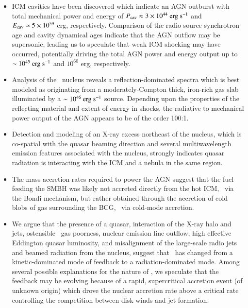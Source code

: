 \documentclass[referee,traditabstract]{aa}
\begin{document}
\begin{itemize}
\item ICM cavities have been discovered which indicate an AGN outburst
  with total mechanical power and energy of $P_{\rm{cav}} \approx 3 \times
  10^{44} ~\rm{\mbox{\ensuremath{\rm{erg}}}~\ensuremath{\rm{\mbox{\ensuremath{\rm{s}}}^{-1}}}}$ and $E_{\rm{cav}} \approx 5 \times 10^{59}$ erg,
  respectively. Comparison of the radio source synchrotron age and
  cavity dynamical ages indicate that the AGN outflow may be
  supersonic, leading us to speculate that weak ICM shocking may have
  occurred, potentially driving the total AGN power and energy output
  up to $\sim 10^{45} ~\rm{\mbox{\ensuremath{\rm{erg}}}~\ensuremath{\rm{\mbox{\ensuremath{\rm{s}}}^{-1}}}}$ and $10^{60}$ erg, respectively.
\item Analysis of the \irs\ nucleus reveals a reflection-dominated
  spectra which is best modeled as originating from a
  moderately-Compton thick, iron-rich gas slab illuminated by a $\sim
  10^{46} ~\rm{\mbox{\ensuremath{\rm{erg}}}~\ensuremath{\rm{\mbox{\ensuremath{\rm{s}}}^{-1}}}}$ source. Depending upon the properties of the
  reflecting material and extent of energy in shocks, the radiative to
  mechanical power output of the AGN appears to be of the order 100:1.
\item Detection and modeling of an X-ray excess northeast of the
  nucleus, which is co-spatial with the quasar beaming direction and
  several multiwavelength emission features associated with the
  nucleus, strongly indicates quasar radiation is interacting with the
  ICM and a nebula in the same region.
\item The mass accretion rates required to power the AGN suggest that
  the fuel feeding the SMBH was likely not accreted directly from the
  hot ICM, \ie\ via the Bondi mechanism, but rather obtained through
  the accretion of cold blobs of gas surrounding the BCG, \ie\ via
  cold-mode accretion.
\item We argue that the presence of a quasar, interaction of the X-ray
  halo and jets, ostensible \irs\ gas poorness, nuclear emission line
  outflow, high effective Eddington quasar luminosity, and
  misalignment of the large-scale radio jets and beamed radiation from
  the nucleus, suggest that \irs\ has changed from a kinetic-dominated
  mode of feedback to a radiation-dominated mode. Among several
  possible explanations for the nature of \irs, we speculate that the
  feedback may be evolving because of a rapid, supercritical accretion
  event (of unknown origin) which drove the nuclear accretion rate
  above a critical rate controlling the competition between disk winds
  and jet formation.
\end{itemize}

\end{document}
